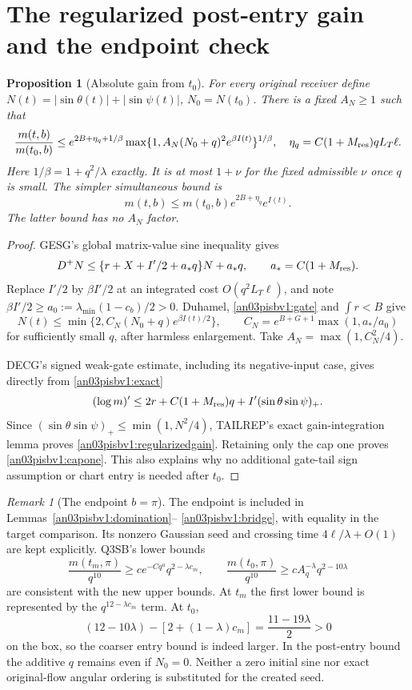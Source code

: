 \documentclass[11pt]{article}
\numberwithin{equation}{section}
\newtheorem{proposition}[theorem]{Proposition}
\theoremstyle{remark}\newtheorem{remark}[theorem]{Remark}
\begin{document}
\section{The regularized post-entry gain and the endpoint check}
\begin{proposition}[Absolute gain from $t_0$]
\label{an03pisbv1:postgain}
For every original receiver define
$N(t)=|\sin\theta(t)|+|\sin\psi(t)|$, $N_0=N(t_0)$.
There is a fixed $A_N\ge1$ such that
\begin{equation}
 \frac{m(t,b)}{m(t_0,b)}
 \le e^{2B+\eta_q+1/\beta}
   \max\{1,A_N(N_0+q)^2e^{\beta I(t)}\}^{1/\beta},
 \quad
 \eta_q=C(1+M_{\rm res})qL_T\ell .
 \label{an03pisbv1:regularizedgain}
\end{equation}
Here $1/\beta=1+q^2/\lambda$ exactly. It is at most $1+\nu$
for the fixed admissible $\nu$ once $q$ is small.
The simpler simultaneous bound is
\begin{equation}
 m(t,b)\le m(t_0,b)e^{2B+\eta_q}e^{I(t)} .
 \label{an03pisbv1:capone}
\end{equation}
The latter bound has no $A_N$ factor.
\end{proposition}
\begin{proof}
GESG's global matrix-value sine inequality gives
\[
 D^+N\le\{r+X+I'/2+a_*q\}N+a_*q,\qquad
 a_*=C(1+M_{\rm res}).
\]
Replace $I'/2$ by $\beta I'/2$ at an integrated cost
$O(q^2L_T\ell)$, and note
$\beta I'/2\ge a_0:=\lambda_{\min}(1-c_b)/2>0$.
Duhamel, \eqref{an03pisbv1:gate} and $\int r<B$ give
\[
 N(t)\le\min\{2,C_N(N_0+q)e^{\beta I(t)/2}\},\qquad
 C_N=e^{B+G+1}\max(1,a_*/a_0)
\]
for sufficiently small $q$, after harmless enlargement.
Take $A_N=\max(1,C_N^2/4)$.

DECG's signed weak-gate estimate, including its negative-input
case, gives directly from \eqref{an03pisbv1:exact}
\[
 (\log m)'\le2r+C(1+M_{\rm res})q
                     +I'(\sin\theta\sin\psi)_+ .
\]
Since $(\sin\theta\sin\psi)_+\le\min(1,N^2/4)$, TAILREP's exact
gain-integration lemma proves \eqref{an03pisbv1:regularizedgain}.
Retaining only the cap one proves \eqref{an03pisbv1:capone}.
This also explains why no additional gate-tail sign assumption
or chart entry is needed after $t_0$.
\end{proof}

\begin{remark}[The endpoint $b=\pi$]
The endpoint is included in Lemmas~\ref{an03pisbv1:domination}--
\ref{an03pisbv1:bridge}, with equality in the target comparison.
Its nonzero Gaussian seed and crossing time $4\ell/\lambda+O(1)$
are kept explicitly. Q3SB's lower bounds
\[
 \frac{m(t_m,\pi)}{q^{10}}
       \ge c e^{-Cq^u}q^{2-\lambda c_m},\qquad
 \frac{m(t_0,\pi)}{q^{10}}
       \ge c A_q^{-\lambda}q^{2-10\lambda}
\]
are consistent with the new upper bounds.
At $t_m$ the first lower bound is represented by the
$q^{12-\lambda c_m}$ term.
At $t_0$,
\[
 (12-10\lambda)-[2+(1-\lambda)c_m]
      =\frac{11-19\lambda}{2}>0
\]
on the box, so the coarser entry bound is indeed larger.
In the post-entry bound the additive $q$ remains even if $N_0=0$.
Neither a zero initial sine nor exact original-flow angular ordering
is substituted for the created seed.
\end{remark}
\end{document}
